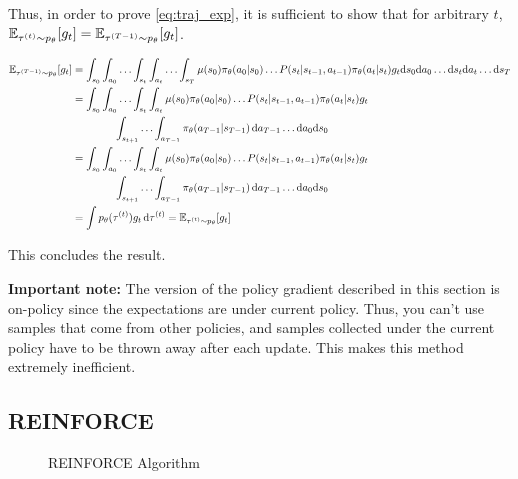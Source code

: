\documentclass{article}
\begin{document}
\begin{tcolorbox}[breakable,enhanced,colback=gray!10!white,colframe=gray!50!black,
title={Policy Gradient Derivation for $J(\theta) = \sum_{t=0}^{T-1} \BBE_{\tau^{(t)} \sim p_\theta}[r(s_t, a_t)]$}]
Thus, in order to prove \eqref{eq:traj_exp}, it is sufficient to show that for arbitrary $t$, ${\mathbb E}_{\tau^{(t)} \sim p_\theta}[g_t] = {\mathbb E}_{\tau^{(T-1)} \sim p_\theta}[ g_t]$.

\begin{align*}
\BBE_{\tau^{(T-1)} \sim p_\theta} [g_t]&= \int_{s_0} \int_{a_0} \ldots \int_{s_t} \int_{a_t} \ldots \int_{s_T} \mu(s_0) \pi_\theta(a_0 \vert s_0) \ldots P(s_t \vert s_{t-1}, a_{t-1}) \pi_\theta(a_t \vert s_t) g_t \ds_0 \da_0 \ldots \ds_t \da_t \ldots \ds_T \\
% 
&= \int_{s_0} \int_{a_0} \ldots \int_{s_t} \int_{a_t} \mu(s_0) \pi_\theta(a_0 \vert s_0) \ldots P(s_t \vert s_{t-1}, a_{t-1}) \pi_\theta(a_t \vert s_t) g_t  \\
&\qquad\qquad\int_{s_{t+1}}\ldots \int_{a_{T-1}} \pi_\theta(a_{T-1} \vert s_{T-1}) \, \da_{T-1} \ldots \da_0 \ds_0 \\
% 
&= \int_{s_0} \int_{a_0} \ldots \int_{s_t} \int_{a_t} \mu(s_0) \pi_\theta(a_0 \vert s_0) \ldots P(s_t \vert s_{t-1}, a_{t-1}) \pi_\theta(a_t \vert s_t) g_t\\
&\qquad \qquad\int_{s_{t+1}} \ldots \int_{a_{T-1}} \pi_\theta(a_{T-1} \vert s_{T-1}) \, \da_{T-1} \ldots \da_0 \ds_0 \\
% 
&= \int p_\theta(\tau^{(t)}) g_t \, \dtau^{(t)} = \BBE_{\tau^{(t)} \sim p_\theta}[g_t]
\end{align*}

This concludes the result.

\end{tcolorbox}


\begin{tcolorbox}[colback=blue!10!white,colframe=blue!50!black]
\textbf{Important note:}
The version of the policy gradient described in this section is on-policy since the expectations are under current policy. Thus, you can't use samples that come from other policies, and samples collected under the current policy have to be thrown away after each update. This makes this method extremely inefficient.
\end{tcolorbox}


\subsection{REINFORCE}
\begin{figure}[ht]
\caption{REINFORCE Algorithm}\label{fig:reinforce}
\end{figure} 
\end{document}
